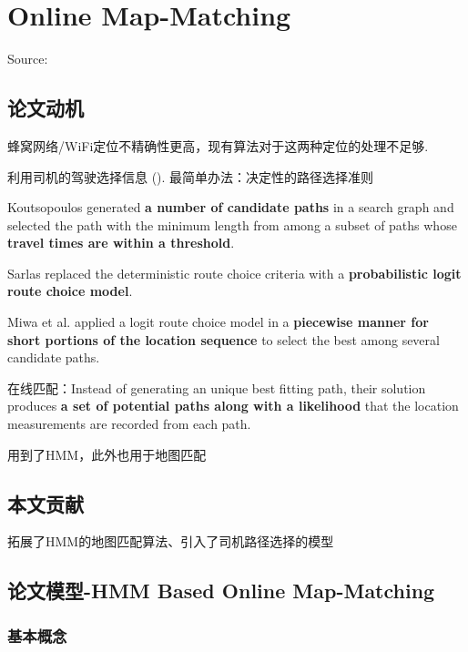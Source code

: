 \chapter{Online Map-Matching}

Source: \cite{Jagadeesh2017} 

\section{论文动机}
    蜂窝网络/WiFi定位不精确性更高，现有算法对于这两种定位的处理不足够. 
    
利用司机的驾驶选择信息 ().
最简单办法：决定性的路径选择准则

\begin{example}
    Koutsopoulos generated \textbf{a number of candidate paths} in a
search graph and selected the path with the minimum length
from among a subset of paths whose \textbf{travel times are within
a threshold}.

Sarlas replaced the deterministic route choice criteria with a
\textbf{probabilistic logit route choice model}.

Miwa et al. applied a logit route choice model in
a \textbf{piecewise manner for short portions of the location sequence}
to select the best among several candidate paths.
\end{example}

在线匹配：Instead of generating an unique best
fitting path, their solution produces \textbf{a set of potential paths
along with a likelihood} that the location measurements are
recorded from each path.

\cite{newson2009hidden} 用到了HMM，此外也用于地图匹配

\section{本文贡献}

拓展了HMM的地图匹配算法、引入了司机路径选择的模型

\section{论文模型-HMM Based Online Map-Matching}

\subsection{基本概念}

